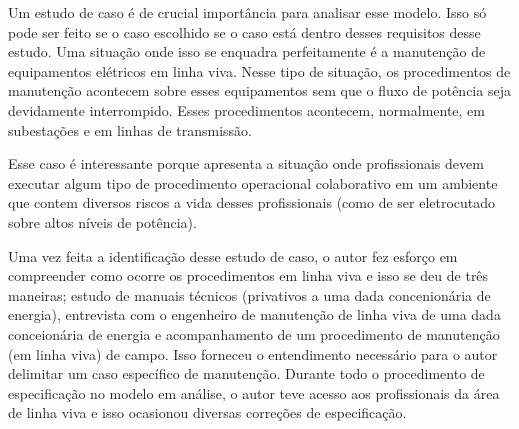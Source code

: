 Um estudo de caso é de crucial importância para analisar esse modelo. Isso só pode ser feito se o caso escolhido se o caso está dentro desses requisitos desse estudo. Uma situação onde isso se enquadra perfeitamente é a manutenção de equipamentos elétricos em linha viva. Nesse tipo de situação, os procedimentos de manutenção acontecem sobre esses equipamentos sem que o fluxo de potência seja devidamente interrompido. Esses procedimentos acontecem, normalmente, em subestações e em linhas de transmissão. 

Esse caso é interessante porque apresenta a situação onde profissionais devem executar algum tipo de procedimento operacional colaborativo em um ambiente que contem diversos riscos a vida desses profissionais (como de ser eletrocutado sobre altos níveis de potência).

Uma vez feita a identificação desse estudo de caso, o autor fez esforço em compreender como ocorre os procedimentos em linha viva e isso se deu de três maneiras; 
estudo de manuais técnicos (privativos a uma dada concenionária de energia), entrevista com o engenheiro de manutenção de linha viva de uma dada conceionária de energia e acompanhamento de um procedimento de manutenção (em linha viva) de campo. Isso forneceu o entendimento necessário para o autor delimitar um caso específico de manutenção. Durante todo o procedimento de especificação no modelo em análise, o autor teve acesso aos profissionais da área de linha viva e isso ocasionou diversas correções de especificação.  